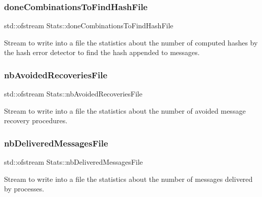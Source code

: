 \subsubsection{\texorpdfstring{done\+Combinations\+To\+Find\+Hash\+File}{doneCombinationsToFindHashFile}}
{\footnotesize\ttfamily std\+::ofstream Stats\+::done\+Combinations\+To\+Find\+Hash\+File\hspace{0.3cm}{\ttfamily [private]}}



Stream to write into a file the statistics about the number of computed hashes by the hash error detector to find the hash appended to messages. 

\mbox{\label{class_stats_a2c1cbc31715b84b8e40206c5b3dc7c5f}} 
\subsubsection{\texorpdfstring{nb\+Avoided\+Recoveries\+File}{nbAvoidedRecoveriesFile}}
{\footnotesize\ttfamily std\+::ofstream Stats\+::nb\+Avoided\+Recoveries\+File\hspace{0.3cm}{\ttfamily [private]}}



Stream to write into a file the statistics about the number of avoided message recovery procedures. 

\mbox{\label{class_stats_acf354d2603af85eff78594ca27e4f189}} 
\subsubsection{\texorpdfstring{nb\+Delivered\+Messages\+File}{nbDeliveredMessagesFile}}
{\footnotesize\ttfamily std\+::ofstream Stats\+::nb\+Delivered\+Messages\+File\hspace{0.3cm}{\ttfamily [private]}}



Stream to write into a file the statistics about the number of messages delivered by processes. 

\mbox{\label{class_stats_aded312adb1d366e759f216fc4f651b4c}} 
